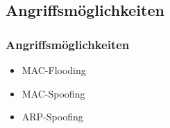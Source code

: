 \documentclass{beamer}
\begin{document}
    	\subsection*{Angriffsmöglichkeiten}
        \begin{frame}
        	\frametitle{Angriffsmöglichkeiten}
        	
        	\begin{itemize}
 
        	\item MAC-Flooding
  
        	\item MAC-Spoofing

        	\item ARP-Spoofing
        	\end{itemize}
                       	
    	\end{frame}
    	
\end{document}
